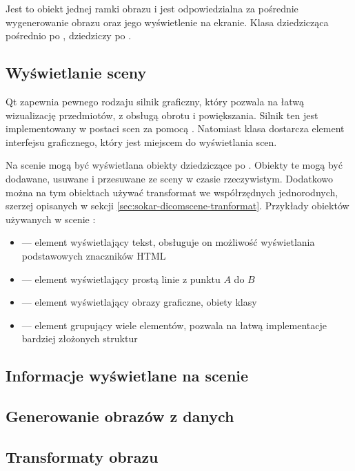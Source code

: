 \label{sec:sokar-dicomscene}

Jest to obiekt jednej ramki obrazu i jest odpowiedzialna za pośrednie wygenerowanie obrazu oraz jego wyświetlenie na ekranie.
Klasa dziedzicząca pośrednio po ,  dziedziczy po .

\subsection{Wyświetlanie sceny}
\par
Qt zapewnia pewnego rodzaju silnik graficzny, który pozwala na łatwą wizualizację przedmiotów, z obsługą obrotu i powiększania.
Silnik ten jest implementowany w postaci scen za pomocą .
Natomiast klasa  dostarcza element interfejsu graficznego, który jest miejscem do wyświetlania scen.
\par
Na scenie mogą być wyświetlana obiekty dziedziczące po .
Obiekty te mogą być dodawane, usuwane i przesuwane ze sceny w czasie rzeczywistym.
Dodatkowo można  na tym obiektach używać transformat we współrzędnych jednorodnych, szerzej opisanych w sekcji \ref{sec:sokar-dicomscene-tranformat}.
Przykłady obiektów używanych w scenie :
\begin{itemize}
    \item {} --- element wyświetlający tekst, obsługuje on możliwość wyświetlania podstawowych znaczników HTML
    \item {} --- element wyświetlający prostą linie z punktu $A$ do $B$
    \item {} --- element wyświetlający obrazy graficzne, obiety klasy 
    \item {} --- element grupujący wiele elementów, pozwala na łatwą implementacje bardziej złożonych struktur
\end{itemize}

\subsection{Informacje wyświetlane na scenie}


\subsection{Generowanie obrazów z danych}


\subsection{Transformaty obrazu}
